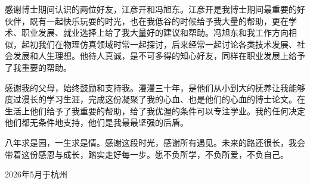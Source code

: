     感谢博士期间认识的两位好友，江彦开和冯旭东。江彦开是我博士期间最重要的好伙伴，既有一起快乐玩耍的时光，也在我低谷的时候给予我大量的帮助，更在学术、职业发展、就业选择上给了我大量好的建议和帮助。冯旭东和我工作方向相似，起初我们在物理仿真领域时常一起探讨，后来经常一起讨论各类技术发展、社会发展和人生理想。他待人真诚，是不可多得的知心好友，同样在职业发展上给予了我重要的帮助。

    感谢我的父母，始终鼓励和支持我。漫漫三十年，是他们从小到大的抚养让我能够度过漫长的学习生涯，完成这份凝聚了我的心血、也是他们的心血的博士论文。在生活上他们给予了我重要的帮助，给了我优渥的条件可以专注学业。我的任何决定他们都无条件地支持，他们是我最最坚强的后盾。

    八年求是园，一生求是情。感谢这段时光，感谢所有遇见。未来的路还很长，我会带着这份感恩与成长，踏实走好每一步。愿不负所学，不负所爱，不负自己。

    \begin{flushright}
        \vspace*{\fill}
        \StudentName

        2026年5月于杭州
    \end{flushright}
